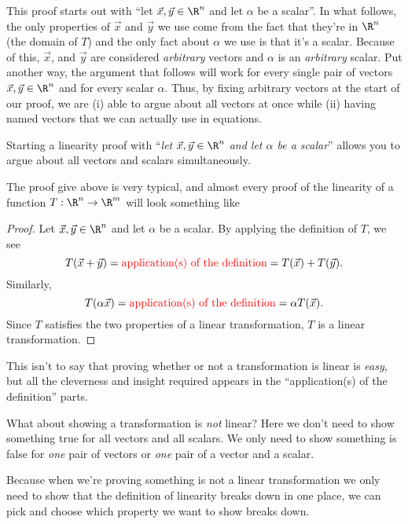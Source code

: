 This proof starts out with ``{\color{red}let $\vec x,\vec y\in \R^n$ and let $\alpha$ be a scalar}''.
In what follows, the only properties of $\vec x$ and $\vec y$ we use come from the fact that they're
in $\R^n$ (the domain of $T$) and the only fact about $\alpha$ we use is that it's a scalar. Because
of this, $\vec x$, and $\vec y$ are considered \emph{arbitrary} vectors and $\alpha$ is an
\emph{arbitrary} scalar. Put another way, the argument that follows will work for every single pair 
of vectors $\vec x,\vec y\in \R^n$ and for every scalar $\alpha$.
Thus, by fixing arbitrary vectors at the start of our proof, we are (i) able to argue about
all vectors at once while (ii) having named vectors that we can actually use in equations.


\begin{emphbox}[Takeaway]
	Starting a linearity proof with ``\emph{let $\vec x,\vec y\in \R^n$ and let $\alpha$ be a scalar}''
	allows you to argue about all vectors and scalars simultaneously.
\end{emphbox}


The proof give above is very typical, and almost every proof of the linearity of a function $T:\R^n\to\R^m$
will look something like
\begin{proof}
	Let $\vec x,\vec y\in \R^n$ and let $\alpha$ be a scalar. By applying the definition
	of $T$, we see
	\[
		T(\vec x+\vec y)=\text{\color{red}application(s) of the definition} = T(\vec x)+T(\vec y).
	\]
	Similarly,
	\[
		T(\alpha\vec x) = \text{\color{red}application(s) of the definition}=\alpha T(\vec x).
	\]
	Since $T$ satisfies the two properties of a linear transformation, $T$ is a linear
	transformation.
\end{proof}

This isn't to say that proving whether or not a transformation is linear is \emph{easy},
but all the cleverness and insight required appears in the ``{\color{red}application(s) of the definition}''
parts.

\bigskip
What about showing a transformation is \emph{not} linear? Here we don't need to show something true for all vectors
and all scalars. We only need to show something is false for \emph{one} pair of vectors or \emph{one} pair of a vector
and a scalar.

Because when we're proving something is not a linear transformation we only need to show
that the definition of linearity breaks down in one place, we can pick and choose which property we
want to show breaks down.

